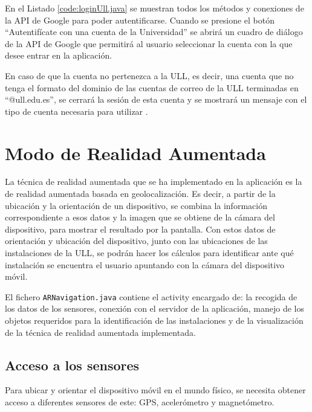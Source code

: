 En el Listado \ref{code:loginUll.java} se muestran todos los métodos y conexiones de la API de Google para poder autentificarse. Cuando se presione el botón ``Autentifícate con una cuenta de la Universidad'' se abrirá un cuadro de diálogo de la API de Google que permitirá al usuario seleccionar la cuenta con la que desee entrar en la aplicación. 

En caso de que la cuenta no pertenezca a la ULL, es decir, una cuenta que no tenga el formato del dominio de las cuentas de correo de la ULL terminadas en ``@ull.edu.es'', se cerrará la sesión de esta cuenta y se mostrará un mensaje con el tipo de cuenta necesaria para utilizar  \ULLAR{}.



 
\section{Modo de Realidad Aumentada}

La técnica de realidad aumentada que se ha implementado en la aplicación es la de realidad aumentada basada en geolocalización. Es decir, a partir de la ubicación y la orientación de un dispositivo, se combina la información correspondiente a esos datos y la imagen que se obtiene de la cámara del dispositivo, para mostrar el resultado por la pantalla. Con estos datos de orientación y ubicación del dispositivo, junto con las ubicaciones de las instalaciones de la ULL, se podrán hacer los cálculos para identificar ante qué instalación se encuentra el usuario apuntando con la cámara del dispositivo móvil.

El fichero \texttt{ARNavigation.java} contiene el activity encargado de: la recogida de los datos de los sensores, conexión con el servidor de la aplicación, manejo de los objetos requeridos para la identificación de las instalaciones y de la visualización de la técnica de realidad aumentada implementada.

\subsection{Acceso a los sensores}

Para ubicar y orientar el dispositivo móvil en el mundo físico, se necesita obtener acceso a diferentes sensores de este: GPS, acelerómetro y magnetómetro. 

